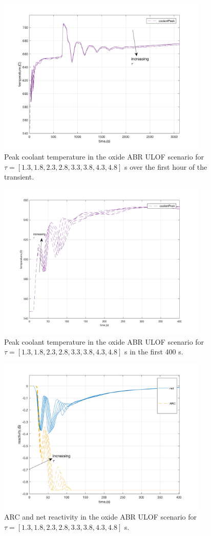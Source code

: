 \documentclass[11pt, oneside]{article}   	%
\begin{document}
\begin{figure}[h!]
\includegraphics[width=10cm]{ULOF_peak}
\centering
\caption{Peak coolant temperature in the oxide ABR ULOF scenario for $\tau=[1.3, 1.8, 2.3, 2.8, 3.3, 3.8, 4.3, 4.8]$ s over the first hour of the transient.}
\label{fig:ULOF_peak}
\end{figure}

\begin{figure}[h!]
\includegraphics[width=10cm]{ULOF_peakShortTerm}
\centering
\caption{Peak coolant temperature in the oxide ABR ULOF scenario for $\tau=[1.3, 1.8, 2.3, 2.8, 3.3, 3.8, 4.3, 4.8]$ s in the first 400 s.}
\label{fig:ULOF_peakShortTerm}
\end{figure}

\begin{figure}[h!]
\includegraphics[width=10cm]{ULOF_rho}
\centering
\caption{ARC and net reactivity in the oxide ABR ULOF scenario for $\tau=[1.3, 1.8, 2.3, 2.8, 3.3, 3.8, 4.3, 4.8]$ s.}
\label{fig:ULOF_rho}
\end{figure}
\end{document}
